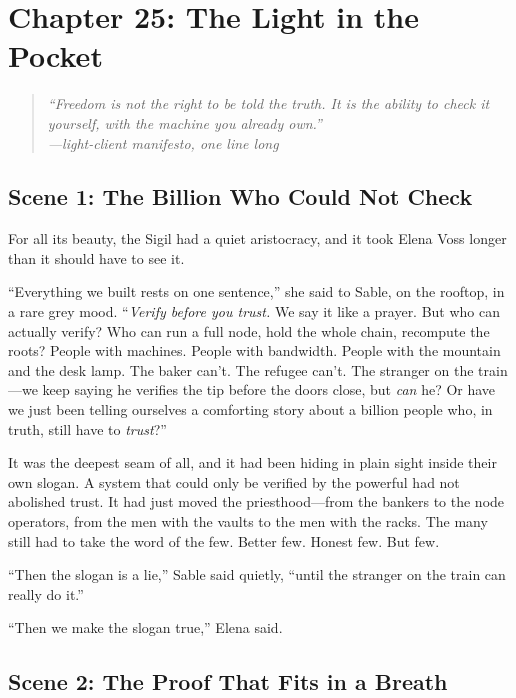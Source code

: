 \hypertarget{chapter-25-the-light-in-the-pocket}{%
\section{Chapter 25: The Light in the
Pocket}\label{chapter-25-the-light-in-the-pocket}}

\begin{quote}
\itshape ``Freedom is not the right to be told the truth. It is the ability to
check it yourself, with the machine you already own.''\\
\normalfont\hfill---light-client manifesto, one line long
\end{quote}

\hypertarget{scene-1-the-billion-who-could-not-check}{%
\subsection{Scene 1: The Billion Who Could Not
Check}\label{scene-1-the-billion-who-could-not-check}}

For all its beauty, the Sigil had a quiet aristocracy, and it took Elena Voss longer
than it should have to see it.

``Everything we built rests on one sentence,'' she said to Sable, on the rooftop, in
a rare grey mood. ``\emph{Verify before you trust.} We say it like a prayer. But who
can actually verify? Who can run a full node, hold the whole chain, recompute the
roots? People with machines. People with bandwidth. People with the mountain and the
desk lamp. The baker can't. The refugee can't. The stranger on the train---we keep
saying he verifies the tip before the doors close, but \emph{can} he? Or have we just
been telling ourselves a comforting story about a billion people who, in truth, still
have to \emph{trust}?''

It was the deepest seam of all, and it had been hiding in plain sight inside their
own slogan. A system that could only be verified by the powerful had not abolished
trust. It had just moved the priesthood---from the bankers to the node operators,
from the men with the vaults to the men with the racks. The many still had to take
the word of the few. Better few. Honest few. But few.

``Then the slogan is a lie,'' Sable said quietly, ``until the stranger on the train
can really do it.''

``Then we make the slogan true,'' Elena said.

\hypertarget{scene-2-the-proof-that-fits-in-a-breath}{%
\subsection{Scene 2: The Proof That Fits in a
Breath}\label{scene-2-the-proof-that-fits-in-a-breath}}

